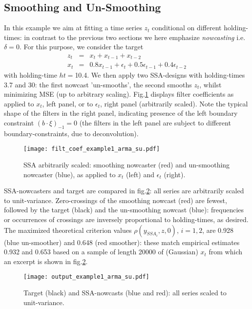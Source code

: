 \documentclass[a4paper]{article}
\begin{document}
\subsection{Smoothing and Un-Smoothing}\label{smooth_unsmooth}
In this example we aim at fitting a time series $z_t$ conditional on different holding-times: in contrast to the previous two sections we here emphasize \emph{nowcasting} i.e.  $\delta=0$. For this purpose, we consider the target 
\begin{eqnarray*}
z_t&=&x_t+x_{t-1}+x_{t-2}\\
x_t&=&0.8x_{t-1}+\epsilon_t+0.5\epsilon_{t-1}+0.4\epsilon_{t-2}
\end{eqnarray*}
with  holding-time $ht=$10.4. We then apply two SSA-designs with holding-times 3.7 and 30: the first nowcast 'un-smooths', the second smooths $z_t$, whilst minimizing MSE (up to arbitrary scaling). Fig.\ref{filt_coef_example1_arma_su} displays filter coefficients as applied to $x_t$, left panel, or to $\epsilon_t$,  right panel (arbitrarily scaled). Note the typical shape of the filters in the right panel, indicating presence of the left boundary constraint $(b\cdot\xi)_{-1}=0$ (the filters in the left panel are subject to different boundary-constraints, due to deconvolution). %
\begin{figure}[H]\begin{center}\texttt{[image: filt\_coef\_example1\_arma\_su.pdf]}\caption{SSA arbitrarily scaled: smoothing nowcaster (red) and un-smoothing nowcaster (blue), as applied to $x_t$ (left) and $\epsilon_t$ (right).\label{filt_coef_example1_arma_su}}\end{center}\end{figure}SSA-nowcasters and target are compared in fig.\ref{output_example1_arma_su}: all series are arbitrarily scaled to unit-variance. Zero-crossings of the smoothing nowcast (red) are fewest, followed by the target (black) and the un-smoothing nowcast (blue): frequencies or occurrences of crossings are inversely proportional to holding-times, as desired. The maximized theoretical criterion values $\rho(y_{SSA_i},z,0)$, $i=1,2$, are 0.928 (blue un-smoother) and 0.648 (red smoother): these match empirical estimates 0.932 and 0.653 based on a sample of length 20000 of (Gaussian) $x_t$ from which an excerpt is shown in fig.\ref{output_example1_arma_su}. 
\begin{figure}[H]\begin{center}\texttt{[image: output\_example1\_arma\_su.pdf]}\caption{Target (black) and SSA-nowcasts (blue and red): all series scaled to unit-variance.\label{output_example1_arma_su}}\end{center}\end{figure}
\end{document}
